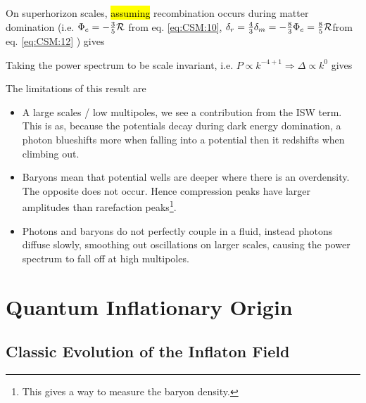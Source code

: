 \documentclass{article}
\begin{document}
\begin{corollary}
On superhorizon scales, \hl{assuming} recombination occurs during matter domination (i.e. $\Phi_e = -\frac{3}{5} \mathcal{R}$ from eq. \ref{eq:CSM:10}, $\delta_r=\frac{4}{3}\delta_m = -\frac{8}{3}\Phi_e = \frac{8}{5} \mathcal{R}$from eq. \ref{eq:CSM:12}  ) gives
\end{corollary}

\begin{corollary}
Taking the power spectrum to be scale invariant, i.e. $P\propto k^{-4+1} \Rightarrow \Delta \propto k^0$ gives 
\end{corollary}

The limitations of this result are 
\begin{itemize}
    \item A large scales / low multipoles, we see a contribution from the ISW term. This is as, because the potentials decay during dark energy domination, a photon blueshifts more when falling into a potential then it redshifts when climbing out. 
    \item Baryons mean that potential wells are deeper where there is an overdensity. The opposite does not occur. Hence compression peaks have larger amplitudes than rarefaction peaks\footnote{This gives a way to measure the baryon density.}. 
    \item Photons and baryons do not perfectly couple in a fluid, instead photons diffuse slowly, smoothing out oscillations on larger scales, causing the power spectrum to fall off at high multipoles. 
\end{itemize}

\section{Quantum Inflationary Origin}


\subsection{Classic Evolution of the Inflaton Field}
\end{document}

